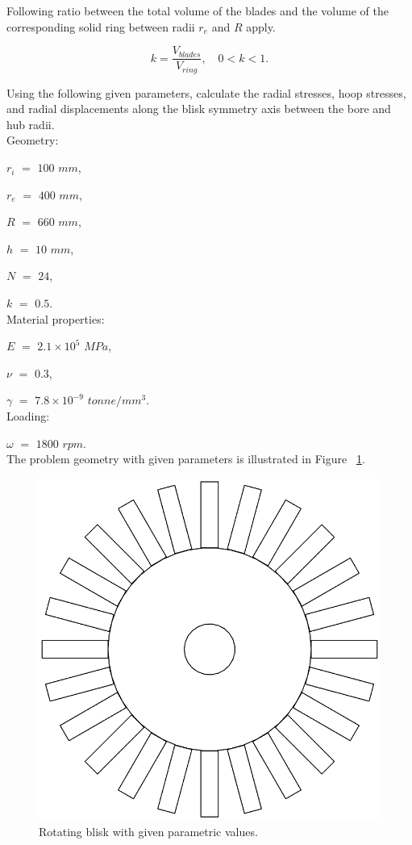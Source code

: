 \documentclass[12pt, a4paper, twoside]{article}
\begin{document}
Following ratio between the total volume of the blades and the volume of the corresponding solid ring between radii $r_e$ and $R$ apply.

\begin{equation}
	\label{equation:volume_ratio}
	k{=}{\frac {{V}_{blades}} {{V}_{ring}}}, \quad 0{<}k{<}1.
\end{equation}

Using the following given parameters, calculate the radial stresses, hoop stresses, and radial displacements along the blisk symmetry axis between the bore and hub radii.\\

Geometry:

$r_i$ $=$ $100$ $mm$,

$r_e$ $=$ $400$ $mm$,

$R$ $=$ $660$ $mm$,

$h$ $=$ $10$ $mm$,

$N$ $=$ $24$,

$k$ $=$ $0.5$.\\


Material properties:

$E$ $=$ $2.1 \times 10^{5}$ $MPa$,

$\nu$ $=$ $0.3$,

$\gamma$ $=$ $7.8 \times 10^{-9}$  $tonne/mm^{3}$.\\


Loading:

$\omega$ $=$ $1800$ $rpm$.\\

The problem geometry with given parameters is illustrated in Figure ~\ref{fig:blisk_with_given_parameters}. 

\begin{figure}[h]
	\centering
	\includegraphics[scale=0.2]{blisk_with_given_parameters}
	\caption{Rotating blisk with given parametric values.}
	\label{fig:blisk_with_given_parameters}
\end{figure}
\end{document}
